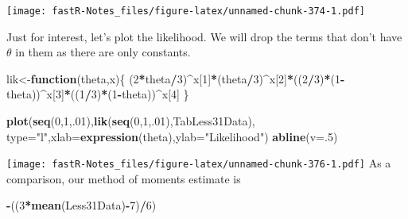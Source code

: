 \documentclass[]{book}
\newenvironment{Shaded}{\begin{snugshade}}{\end{snugshade}}
\newcommand{\KeywordTok}[1]{\textcolor[rgb]{0.13,0.29,0.53}{\textbf{#1}}}
\newcommand{\DataTypeTok}[1]{\textcolor[rgb]{0.13,0.29,0.53}{#1}}
\newcommand{\DecValTok}[1]{\textcolor[rgb]{0.00,0.00,0.81}{#1}}
\newcommand{\StringTok}[1]{\textcolor[rgb]{0.31,0.60,0.02}{#1}}
\newcommand{\ControlFlowTok}[1]{\textcolor[rgb]{0.13,0.29,0.53}{\textbf{#1}}}
\newcommand{\OperatorTok}[1]{\textcolor[rgb]{0.81,0.36,0.00}{\textbf{#1}}}
\newcommand{\NormalTok}[1]{#1}
\theoremstyle{definition}
\theoremstyle{definition}
\theoremstyle{definition}
\theoremstyle{remark}
\begin{document}
\texttt{[image: fastR-Notes\_files/figure-latex/unnamed-chunk-374-1.pdf]}

Just for interest, let's plot the likelihood. We will drop the terms
that don't have \(\theta\) in them as there are only constants.

\begin{Shaded}
\begin{Highlighting}[]
\NormalTok{lik<-}\ControlFlowTok{function}\NormalTok{(theta,x)\{}
\NormalTok{    (}\DecValTok{2}\OperatorTok{*}\NormalTok{theta}\OperatorTok{/}\DecValTok{3}\NormalTok{)}\OperatorTok{^}\NormalTok{x[}\DecValTok{1}\NormalTok{]}\OperatorTok{*}\NormalTok{(theta}\OperatorTok{/}\DecValTok{3}\NormalTok{)}\OperatorTok{^}\NormalTok{x[}\DecValTok{2}\NormalTok{]}\OperatorTok{*}\NormalTok{((}\DecValTok{2}\OperatorTok{/}\DecValTok{3}\NormalTok{)}\OperatorTok{*}\NormalTok{(}\DecValTok{1}\OperatorTok{-}\NormalTok{theta))}\OperatorTok{^}\NormalTok{x[}\DecValTok{3}\NormalTok{]}\OperatorTok{*}\NormalTok{((}\DecValTok{1}\OperatorTok{/}\DecValTok{3}\NormalTok{)}\OperatorTok{*}\NormalTok{(}\DecValTok{1}\OperatorTok{-}\NormalTok{theta))}\OperatorTok{^}\NormalTok{x[}\DecValTok{4}\NormalTok{]}
\NormalTok{    \}}
\end{Highlighting}
\end{Shaded}

\begin{Shaded}
\begin{Highlighting}[]
\KeywordTok{plot}\NormalTok{(}\KeywordTok{seq}\NormalTok{(}\DecValTok{0}\NormalTok{,}\DecValTok{1}\NormalTok{,.}\DecValTok{01}\NormalTok{),}\KeywordTok{lik}\NormalTok{(}\KeywordTok{seq}\NormalTok{(}\DecValTok{0}\NormalTok{,}\DecValTok{1}\NormalTok{,.}\DecValTok{01}\NormalTok{),TabLess31Data),}
     \DataTypeTok{type=}\StringTok{"l"}\NormalTok{,}\DataTypeTok{xlab=}\KeywordTok{expression}\NormalTok{(theta),}\DataTypeTok{ylab=}\StringTok{"Likelihood"}\NormalTok{)}
\KeywordTok{abline}\NormalTok{(}\DataTypeTok{v=}\NormalTok{.}\DecValTok{5}\NormalTok{)}
\end{Highlighting}
\end{Shaded}

\texttt{[image: fastR-Notes\_files/figure-latex/unnamed-chunk-376-1.pdf]}
As a comparison, our method of moments estimate is

\begin{Shaded}
\begin{Highlighting}[]
\OperatorTok{-}\NormalTok{((}\DecValTok{3}\OperatorTok{*}\KeywordTok{mean}\NormalTok{(Less31Data)}\OperatorTok{-}\DecValTok{7}\NormalTok{)}\OperatorTok{/}\DecValTok{6}\NormalTok{)}
\end{Highlighting}
\end{Shaded}
\end{document}

